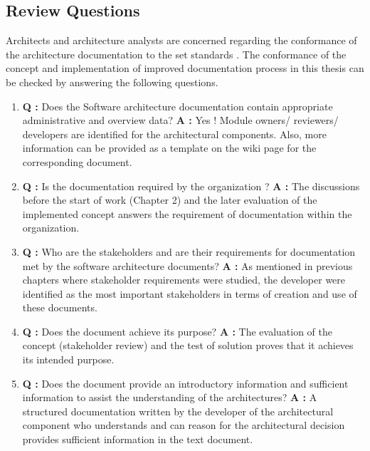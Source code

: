 \subsection{Review Questions}
Architects and architecture analysts are concerned regarding the conformance of the architecture documentation to the set standards \cite{BachmannDocumentingSoftware2010}. The conformance of the concept and implementation of improved documentation process in this thesis can be checked by answering the following questions\cite{BachmannDocumentingSoftware2010}.
\begin{enumerate}
\item \textbf{Q : }Does the Software architecture documentation contain appropriate administrative and overview data?
\newline
\textbf{A : } Yes ! Module owners/ reviewers/ developers are identified for the architectural components. Also, more information can be provided as a template on the wiki page for the corresponding document. 
\item \textbf{Q : }Is the documentation required by the organization ?
\newline
\textbf{A : }The discussions before the start of work (Chapter 2) and the later evaluation of the implemented concept answers the requirement of documentation within the organization.
\item \textbf{Q : }Who are the stakeholders and are their requirements for documentation met by the software architecture documents?
\newline
\textbf{A : }As mentioned in previous chapters where stakeholder requirements were studied, the developer were identified as the most important stakeholders in terms of creation and use of these documents.
\item \textbf{Q : }Does the document achieve its purpose?
\newline 
\textbf{A : }The evaluation of the concept (stakeholder review) and the test of solution proves that it achieves its intended purpose.
\item \textbf{Q : }Does the document provide an introductory information and sufficient information to assist the understanding of the architectures?
\newline
\textbf{A : } A structured documentation written by the developer of the architectural component who understands and can reason for the architectural decision provides sufficient information in the text document. 
\end{enumerate}
